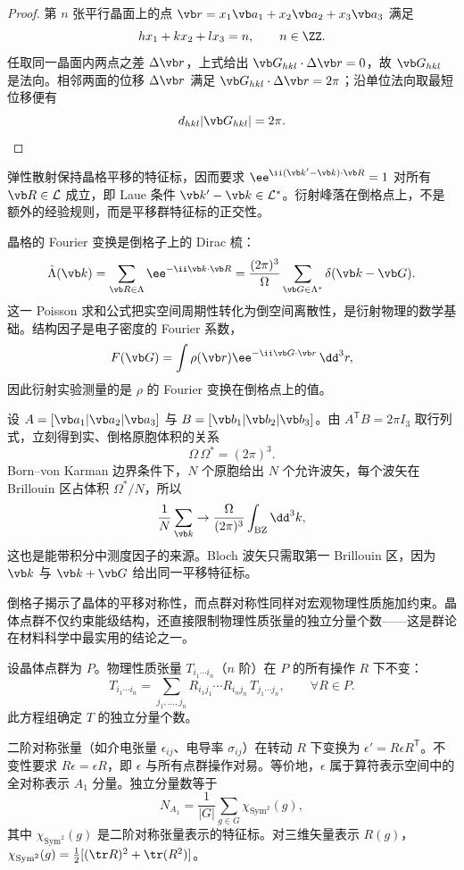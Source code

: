 \begin{proof}
第 $n$ 张平行晶面上的点 $\vb r=x_1\vb a_1+x_2\vb a_2+x_3\vb a_3$ 满足
\[
hx_1+kx_2+lx_3=n,
\qquad n\in\ZZ.
\]
任取同一晶面内两点之差 $\Delta\vb r$，上式给出 $\vb G_{hkl}\cdot\Delta\vb r=0$，故 $\vb G_{hkl}$ 是法向。相邻两面的位移 $\Delta\vb r$ 满足 $\vb G_{hkl}\cdot\Delta\vb r=2\pi$；沿单位法向取最短位移便有
\[
d_{hkl}|\vb G_{hkl}|=2\pi.
\]
\end{proof}

\par\medskip
\par\medskip

弹性散射保持晶格平移的特征标，因而要求 $\ee^{\ii(\vb k'-\vb k)\cdot\vb R}=1$ 对所有 $\vb R\in\mathcal L$ 成立，即 Laue 条件 $\vb k'-\vb k\in\mathcal L^*$。衍射峰落在倒格点上，不是额外的经验规则，而是平移群特征标的正交性。

晶格的 Fourier 变换是倒格子上的 Dirac 梳：
\[
\hat\Lambda(\vb k)
=\sum_{\vb R\in\Lambda}\ee^{-\ii \vb k\cdot\vb R}
=\frac{(2\pi)^3}{\Omega}
\sum_{\vb G\in\Lambda^*}\delta(\vb k-\vb G).
\]
这一 Poisson 求和公式把实空间周期性转化为倒空间离散性，是衍射物理的数学基础。结构因子是电子密度的 Fourier 系数，
\[
F(\vb G)=\int\rho(\vb r)\ee^{-\ii \vb G\cdot\vb r}\,\dd^3r,
\]
因此衍射实验测量的是 $\rho$ 的 Fourier 变换在倒格点上的值。

设 $A=[\vb a_1|\vb a_2|\vb a_3]$ 与 $B=[\vb b_1|\vb b_2|\vb b_3]$。由 $A^{\mathsf T}B=2\pi I_3$ 取行列式，立刻得到实、倒格原胞体积的关系
\[
\Omega\,\Omega^*=(2\pi)^3.
\]
Born--von Karman 边界条件下，$N$ 个原胞给出 $N$ 个允许波矢，每个波矢在 Brillouin 区占体积 $\Omega^*/N$，所以
\[
\frac{1}{N}\sum_{\vb k}\to\frac{\Omega}{(2\pi)^3}\int_{\mathrm{BZ}}\dd^3k,
\]
这也是能带积分中测度因子的来源。Bloch 波矢只需取第一 Brillouin 区，因为 $\vb k$ 与 $\vb k+\vb G$ 给出同一平移特征标。

倒格子揭示了晶体的平移对称性，而点群对称性同样对宏观物理性质施加约束。晶体点群不仅约束能级结构，还直接限制物理性质张量的独立分量个数——这是群论在材料科学中最实用的结论之一。

\begin{theorem}[张量不变性原理]
设晶体点群为 $P$。物理性质张量 $T_{i_1\cdots i_n}$（$n$ 阶）在 $P$ 的所有操作 $R$ 下不变：
\[
T_{i_1\cdots i_n}
=\sum_{j_1,\dots,j_n}
R_{i_1 j_1}\cdots R_{i_n j_n}\,T_{j_1\cdots j_n},
\qquad\forall R\in P.
\]
此方程组确定 $T$ 的独立分量个数。
\label{thm:tensor-invariance}
\end{theorem}

二阶对称张量（如介电张量 $\epsilon_{ij}$、电导率 $\sigma_{ij}$）在转动 $R$ 下变换为 $\epsilon'=R\epsilon R^{\mathsf T}$。不变性要求 $R\epsilon=\epsilon R$，即 $\epsilon$ 与所有点群操作对易。等价地，$\epsilon$ 属于算符表示空间中的全对称表示 $A_1$ 分量。独立分量数等于
\[
N_{A_1}=\frac{1}{|G|}\sum_{g\in G}\chi_{\mathrm{Sym}^2}(g),
\]
其中 $\chi_{\mathrm{Sym}^2}(g)$ 是二阶对称张量表示的特征标。对三维矢量表示 $R(g)$，$\chi_{\mathrm{Sym}^2}(g)=\frac12[(\tr R)^2+\tr(R^2)]$。

